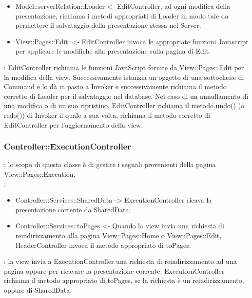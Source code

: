 {{\begin{itemize}
			\item Model::\-serverRelation::\-Loader <- EditController, ad ogni modifica della presentazione, richiama i metodi appropriati di Loader in modo tale da permettere il salvataggio della presentazione stessa nel Server;

			\item View::\-Pages::\-Edit:: <- EditController invoca le appropriate funzioni Javascript per applicare le modifiche alla presentazione sulla pagina di Edit.
		\end{itemize} 
		\textbf{\interfacce}: EditController richiama le funzioni JavaScript fornite da View::\-Pages::\-Edit per la modifica della view. Successivamente istanzia un oggetto di una sottoclasse di Command e lo dà in pasto a Invoker e successivamente richiama il metodo corretto di Loader per il salvataggio nel database. Nel caso di un annullamento di una modifica o di un suo ripristino, EditController richiama il metodo undo() (o redo()) di Invoker il quale a sua volta, richiama il metodo corretto di EditController per l'aggiornamento della view.
	}
		
	\subsubsection{Controller::\-ExecutionController}{
		\textbf{\tipo}: lo scopo di questa classe è di gestire i segnali provenienti della pagina View::\-Pages::\-Execution.\\	
		\textbf{\relaz}:
		\begin{itemize}
			\item Controller::\-Services::\-SharedData -> ExecutionController ricava la presentazione corrente da SharedData;
			\item Controller::\-Services::\-toPages <- Quando la view invia una richiesta di reindirizzamento alla pagina View::\-Pages::\-Home o View::\-Pages::\-Edit, HeaderController invoca il metodo appropriato di toPages.
		\end{itemize}
		\textbf{\interfacce}: la view invia a ExecutionController una richiesta di reindirizzamento ad una pagina oppure per ricavare la presentazione corrente. ExecutionController richiama il metodo appropriato di toPages, se la richiesta è un reindirizzamento, oppure di SharedData.
	}
	
}

